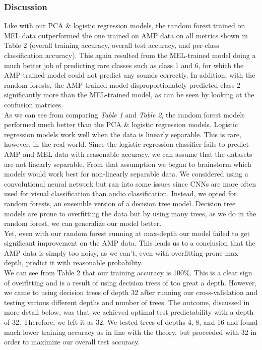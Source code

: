 \documentclass[11pt]{article}
\begin{document}
\subsubsection{Discussion}
Like with our PCA \& logistic regression models, the random forest trained on MEL data outperformed the one trained on AMP data on all metrics shown in Table 2 (overall training accuracy, overall test accuracy, and per-class classification accuracy). This again resulted from the MEL-trained model doing a much better job of predicting rare classes such as class 1 and 6, for which the AMP-trained model could not predict any sounds correctly. In addition, with the random forests, the AMP-trained model disproportionately predicted class 2 significantly more than the MEL-trained model, as can be seen by looking at the confusion matrices.\\

\noindent As we can see from comparing \textit{Table 1} and \textit{Table 2}, the random forest models performed much better than the PCA \& logistic regression models. Logistic regression models work well when the data is linearly separable. This is rare, however, in the real world. Since the logistic regression classifier fails to predict AMP and MEL data with reasonable accuracy, we can assume that the datasets are not linearly separable. From that assumption we began to brainstorm which models would work best for non-linearly separable data. We considered using a convolutional neural network but ran into some issues since CNNs are more often used for visual classification than audio classification. Instead, we opted for random forests, an ensemble version of a decision tree model. Decision tree models are prone to overfitting the data but by using many trees, as we do in the random forest, we can generalize our model better.\\ 

\noindent Yet, even with our random forest running at max-depth our model failed to get significant improvement on the AMP data. This leads us to a conclusion that the AMP data is simply too noisy, as we can't, even with overfitting-prone max-depth, predict it with reasonable probability.\\ 

\noindent We can see from Table 2 that our training accuracy is 100\%. This is a clear sign of overfitting and is a result of using decision trees of too great a depth. However, we came to using decision trees of depth 32 after running our cross-validation and testing various different depths and number of trees. The outcome, discussed in more detail below, was that we achieved optimal test predictability with a depth of 32. Therefore, we left it as 32. We tested trees of depths 4, 8, and 16 and found much lower training accuracy as in line with the theory, but proceeded with 32 in order to maximize our overall test accuracy.\\ 
\end{document}
